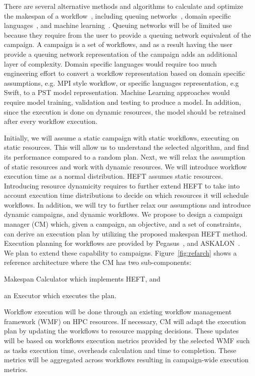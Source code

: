 There are several alternative methods and algorithms to calculate and optimize the makespan of a workflow~\cite{lu2019review}, including queuing networks~\cite{yao2019throughput,bao2019performance}, domain specific languages~\cite{carothers2017durango,maheshwari2016workflow}, and machine learning~\cite{witt2019predictive,pumma2017runtime}.
Queuing networks will be of limited use because they require from the user to provide a queuing network equivalent of the campaign.
A campaign is a set of workflows, and as a result having the user provide a queuing network representation of the campaign adds an additional layer of complexity.
Domain specific languages would require too much engineering effort to convert a workflow representation based on domain specific assumptions, e.g. MPI style workflow, or specific languages representation, e.g Swift, to a PST model representation.
Machine Learning approaches would require model training, validation and testing to produce a model.
In addition, since the execution is done on dynamic resources, the model should be retrained after every workflow execution.

Initially, we will assume a static campaign with static workflows, executing on static resources. 
This will allow us to understand the selected algorithm, and find its performance compared to a random plan.
Next, we will relax the assumption of static resources and work with dynamic resources.
We will introduce workflow execution time as a normal distribution.
HEFT assumes static resources.
Introducing resource dynamicity requires to further extend HEFT to take into account execution time distributions to decide on which resources it will schedule workflows.
In addition, we will try to further relax our assumptions and introduce dynamic campaigns, and dynamic workflows.
We propose to design a campaign manager (CM) which, given a campaign, an objective, and a set of constraints, can derive an execution plan by utilizing the proposed makespan HEFT method.
Execution planning for workflows are provided by Pegasus~\cite{deelman2015pegasus}, and ASKALON~\cite{fahringer2005askalon}.
We plan to extend these capability to campaigns.
Figure~\ref{fig:refarch} shows a reference architecture where the CM has two sub-components:
\begin{inparaenum}[(1)]
\item Makespan Calculator which implements HEFT, and
\item an Executor which executes the plan. 
\end{inparaenum}
Workflow execution will be done through an existing workflow management framework (WMF) on HPC resources.
If necessary, CM will adapt the execution plan by updating the workflows to resource mapping decisions. 
These updates will be based on workflows execution metrics provided by the selected WMF such as tasks execution time, overheads calculation and time to completion.
These metrics will be aggregated across workflows resulting in campaign-wide execution metrics.

